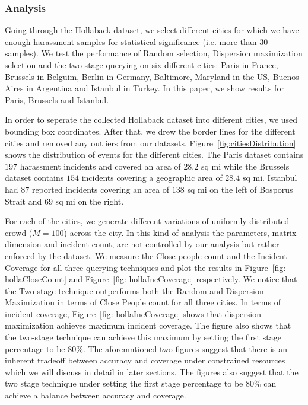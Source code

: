 \documentclass{acm_proc_article-sp}
\begin{document}
\subsubsection{Analysis}
Going through the Hollaback dataset, we select different cities for which we have enough harassment samples for statistical significance (i.e. more than 30 samples). We test the performance of Random selection, Dispersion maximization selection and the two-stage querying on six different cities: Paris in France, Brussels in Belguim, Berlin in Germany, Baltimore, Maryland in the US, Buenos Aires in Argentina and Istanbul in Turkey. In this paper, we show results for Paris, Brussels and Istanbul. \par

In order to seperate the collected Hollaback dataset into different cities, we used bounding box coordinates. After that, we drew the border lines for the different cities and removed any outliers from our datasets. Figure~\ref{fig:citiesDistribution} shows the distribution of events for the different cities. The Paris dataset contains $197$ harassment incidents and covered an area of $28.2$ sq mi while the Brussels dataset contains $154$ incidents covering a geographic area of $28.4$ sq mi. Istanbul had $87$ reported incidents covering an area of $138$ sq mi on the left of Bosporus Strait and $69$ sq mi on the right. \par

For each of the cities, we generate different variations of uniformly distributed crowd ($M = 100$) across the city. In this kind of analysis the parameters, matrix dimension and incident count, are not controlled by our analysis but rather enforced by the dataset. We measure the Close people count and the Incident Coverage for all three querying techniques and plot the results in Figure~\ref{fig: hollaCloseCount} and Figure~\ref{fig: hollaIncCoverage} respectively. We notice that the Two-stage technique outperforms both the Random and Dispersion Maximization in terms of Close People count for all three cities. In terms of incident coverage, Figure~\ref{fig: hollaIncCoverage} shows that dispersion maximization achieves maximum incident coverage. The figure also shows that the two-stage technique can achieve this maximum by setting the first stage percentage to be $80\%$. The aforemntioned two figures suggest that there is an inherent tradeoff between accuracy and coverage under constrained resources which we will discuss in detail in later sections. The figures also suggest that the two stage technique under setting the  first stage percentage to be $80\%$ can achieve a balance between accuracy and coverage.
\end{document}
